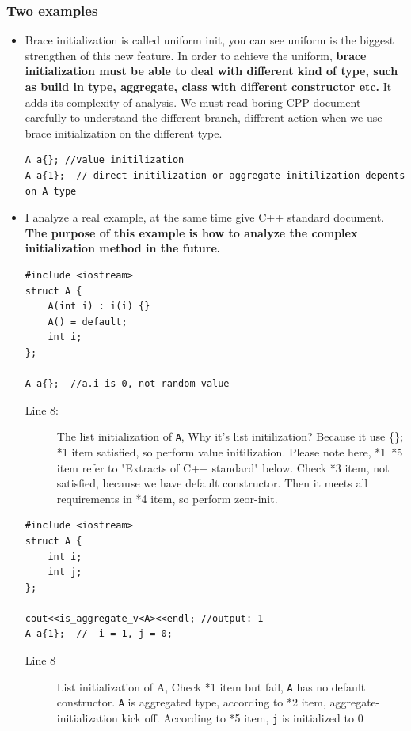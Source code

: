 \documentclass[a4paper,11pt,twoside]{book}
\begin{document}
\subsubsection{Two examples}
\begin{itemize}
	
		\item Brace initialization is called uniform init, you can see uniform is the biggest strengthen of this new feature. In order to achieve the uniform, \textbf{brace initialization must be able to deal with different kind of type, such as build in type, aggregate, class with different constructor etc.} It adds its complexity of analysis. We must read boring CPP document carefully to understand the different branch, different action when we use brace initialization on the different type. 
\begin{lstlisting}
A a{}; //value initilization
A a{1};	 // direct initilization or aggregate initilization depents on A type
\end{lstlisting}	
	
		
	\item I analyze a real example, at the same time give C++ standard document. \textbf{The purpose of this example is how to analyze the complex initialization method in the future.}
\begin{lstlisting}
#include <iostream>
struct A {
	A(int i) : i(i) {}
	A() = default;
	int i;
};
		
A a{};  //a.i is 0, not random value
\end{lstlisting}
	
	\begin{description}
		\item[Line 8:]  The list initialization of \texttt{A}, Why it's list initilization? Because it use \{\}; *1 item satisfied, so perform value initilization. Please note here, *1~*5 item refer to "Extracts of C++ standard" below. Check *3 item, not satisfied, because we have default constructor. Then it meets all requirements in *4 item, so perform zeor-init.
	\end{description}
	
	
\begin{lstlisting}
#include <iostream>
struct A {
	int i;
	int j;
};

cout<<is_aggregate_v<A><<endl; //output: 1
A a{1};  //  i = 1, j = 0;
\end{lstlisting}
	
	\begin{description}
		\item[Line 8] List initialization of A, Check *1 item but fail, \texttt{A} has no default constructor. \texttt{A} is aggregated type, according to *2 item, aggregate-initialization kick off. According to *5 item, \texttt{j} is initialized to 0		
	\end{description}
	

\end{itemize}
\end{document}
